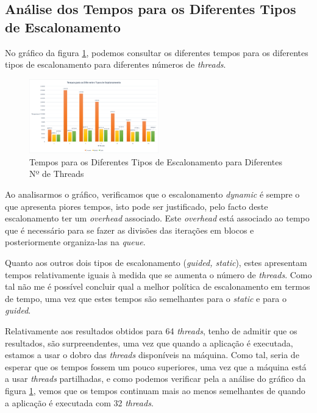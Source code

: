 \documentclass[conference,compsoc]{IEEEtran}
\begin{document}
\subsection{Análise dos Tempos para os Diferentes Tipos de Escalonamento}

No gráfico da figura \ref{fig:sched}, podemos consultar os diferentes tempos para os diferentes tipos de escalonamento para diferentes números de \textit{threads}.

\begin{figure}[H]
\begin{center}
\includegraphics[width=0.5\textwidth]{grafico_tempos.png}
\caption{Tempos para os Diferentes Tipos de Escalonamento para Diferentes Nº de Threads}
\label{fig:sched}
\end{center}
\end{figure}

Ao analisarmos o gráfico, verificamos que o escalonamento \textit{dynamic} é sempre o que apresenta piores tempos, isto pode ser justificado, pelo facto deste escalonamento ter um \textit{overhead} associado. Este \textit{overhead} está associado ao tempo que é necessário para se fazer as divisões das iterações em blocos e posteriormente organiza-las na \textit{queue}.

Quanto aos outros dois tipos de escalonamento (\textit{guided, static}), estes apresentam tempos relativamente iguais à medida que se aumenta o número de \textit{threads}. Como tal não me é possível concluir qual a melhor política de escalonamento em termos de tempo, uma vez que estes tempos são semelhantes para o \textit{static} e para o \textit{guided}.

Relativamente aos resultados obtidos para 64 \textit{threads}, tenho de admitir que os resultados, são surpreendentes, uma vez que quando a aplicação é executada, estamos a usar o dobro das \textit{threads} disponíveis na máquina. Como tal, seria de esperar que os tempos fossem um pouco superiores, uma vez que a máquina está a usar \textit{threads} partilhadas, e como podemos verificar pela a análise do gráfico da figura \ref{fig:sched}, vemos que os tempos continuam mais ao menos semelhantes de quando a aplicação é executada com 32 \textit{threads}.
\end{document}
